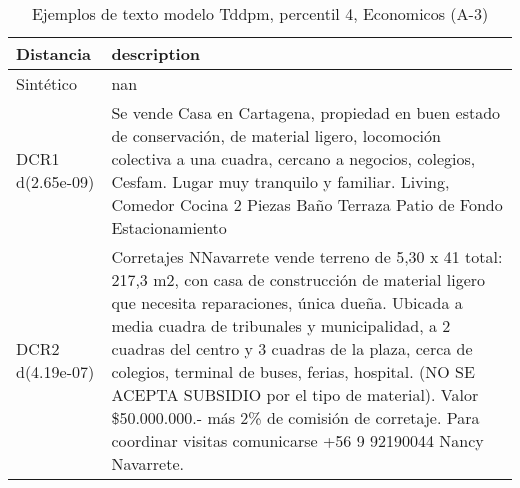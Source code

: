 \begin{table}[H]
\centering
\fontsize{10}{14}\selectfont
\caption{Ejemplos de texto modelo Tddpm, percentil 4, Economicos (A-3)}
\label{table-example-economicos-a-3-tddpm_mlp-4p-text}
\begin{tabular}{|l|m{35em}|}
\hline
\rowcolor[gray]{0.8}
Distancia & description \\
\hline Sintético & nan \\
\hline DCR1 d(2.65e-09) & Se vende Casa en Cartagena, propiedad en buen estado de conservaci\'on, de material ligero, locomoci\'on colectiva a una cuadra, cercano a negocios, colegios, Cesfam. Lugar muy tranquilo y familiar.    Living, Comedor   Cocina   2 Piezas   Ba\~no   Terraza   Patio de Fondo   Estacionamiento \\
\hline DCR2 d(4.19e-07) & Corretajes NNavarrete vende terreno de 5,30 x 41 total: 217,3 m2, con casa de construcci\'on de material ligero que necesita reparaciones, \'unica due\~na. Ubicada a media cuadra de tribunales y municipalidad, a 2 cuadras del centro y 3 cuadras de la plaza, cerca de colegios, terminal de buses, ferias, hospital. (NO SE ACEPTA SUBSIDIO por el tipo de material). Valor \$50.000.000.- m\'as 2\% de comisi\'on de corretaje. Para coordinar visitas comunicarse +56 9 92190044 Nancy Navarrete. \\
\hline
\end{tabular}
\end{table}
